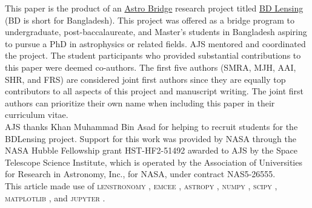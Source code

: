 \documentclass{aa}
\begin{document}
\begin{acknowledgements}
    This paper is the product of an \href{https://www.astrobridge.org/}{Astro Bridge} research project titled \href{https://www.astrobridge.org/projects/bdlensing}{BD Lensing} (BD is short for Bangladesh). This project was offered as a bridge program to undergraduate, post-baccalaureate, and Master's students in Bangladesh aspiring to pursue a PhD in astrophysics or related fields. AJS mentored and coordinated the project. The student participants who provided substantial contributions to this paper were deemed co-authors. The first five authors (SMRA, MJH, AAI, SHR, and FRS) are considered joint first authors since they are equally top contributors to all aspects of this project and manuscript writing. The joint first authors can prioritize their own name when including this paper in their curriculum vitae. \\


      AJS thanks Khan Muhammad Bin Asad for helping to recruit students for the BDLensing project. Support for this work was provided by NASA through the NASA Hubble Fellowship grant HST-HF2-51492 awarded to AJS by the Space Telescope Science Institute, which is operated by the Association of Universities for Research in Astronomy, Inc., for NASA, under contract NAS5-26555.\\

      This article made use of \textsc{lenstronomy} \citep{bib3:Birrer18, bib3:Birrer21},  \textsc{emcee} \citep{Foreman-Mackey13}, \textsc{astropy} \citep{bib3:AstropyCollaboration13, bib3:AstropyCollaboration18, bib3:Astropy22}, \textsc{numpy} \citep{bib3:Oliphant15}, \textsc{scipy} \citep{bib3:Jones01}, \textsc{matplotlib} \citep{bib3:Hunter07}, and \textsc{jupyter} \citep{Kluyver16}.
\end{acknowledgements}

%
%



\end{document}
